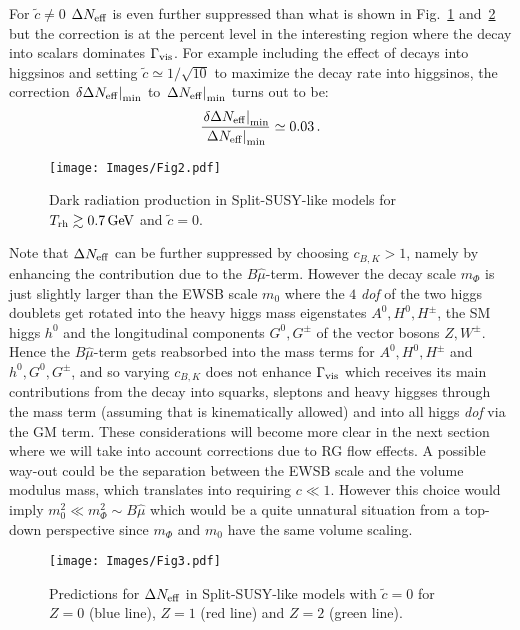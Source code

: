 \documentclass[12pt,a4paper]{book}
\begin{document}
For $\tilde{c} \neq 0$ $\Delta N_{\rm eff}$ is even further suppressed than what is shown in Fig.~\ref{ris1} and~\ref{z123} but the correction is at the percent level in the interesting region where the decay into scalars dominates $\Gamma_{\rm vis}$. For example including the effect of decays into higgsinos and setting $\tilde{c} \simeq 1/\sqrt{10}$ to maximize the decay rate into higgsinos, the correction $\left.\delta \Delta N_{\rm eff}\right|_{\rm min}$ to $\left.\Delta N_{\rm eff}\right|_{\rm min}$ turns out to be:
\begin{align}
\frac{\left.\delta \Delta N_{\rm eff}\right|_{\rm min}}{\left.\Delta N_{\rm eff}\right|_{\rm min}} \simeq 0.03 \,.
\end{align}

\begin{figure}[!ht]
\begin{center}
\texttt{[image: Images/Fig2.pdf]}
\caption{Dark radiation production in Split-SUSY-like models for $T_{\rm rh} \gtrsim 0.7 \, {\rm GeV}$ and $\tilde{c}=0$.} 
\label{ris1}
\end{center}
\end{figure}

Note that $\Delta N_{\rm eff}$ can be further suppressed by choosing $c_{B,K} > 1$, namely by enhancing the contribution due to the $B\hat\mu$-term. However 
the decay scale $m_\Phi$ is just slightly larger than the EWSB scale $m_0$ where the $4$ \textit{dof} of the two higgs doublets get rotated into the heavy higgs mass eigenstates $A^0, H^0, H^\pm$, the SM higgs $h^0$ and the longitudinal components $G^0, G^\pm$ of the vector bosons $Z, W^\pm$. Hence the $B\hat\mu$-term gets reabsorbed into the mass terms for $A^0, H^0, H^\pm$ and $h^0, G^0, G^\pm$, and so varying $c_{B,K}$ does not enhance $\Gamma_{\rm vis}$ which receives its main contributions from the decay into squarks, sleptons and heavy higgses through the mass term (assuming that is kinematically allowed) and into all higgs \textit{dof} via the GM term. These considerations will become more clear in the next section where we will take into account corrections due to RG flow effects. A possible way-out could be the separation between the EWSB scale and the volume modulus mass, which translates into requiring $c \ll 1$. However this choice would imply $m_0^2 \ll m_\Phi^2 \sim B\hat\mu$ which would be a quite unnatural situation from a top-down perspective since $m_\Phi$ and $m_0$ have the same volume scaling.

\begin{figure}[!ht]
\begin{center}
\texttt{[image: Images/Fig3.pdf]}
\caption{Predictions for $\Delta N_{\rm eff}$ in Split-SUSY-like models with $\tilde{c}=0$ for $Z = 0$ (blue line), $Z = 1$ (red line) and $Z = 2$ (green line).} 
\label{z123}
\end{center}
\end{figure}
\end{document}
